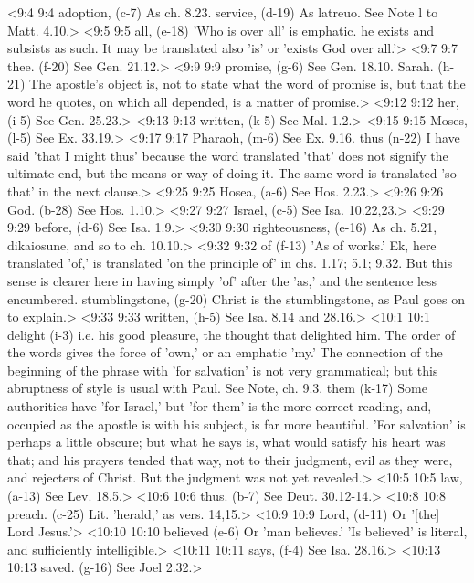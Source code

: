 <9:4 9:4  adoption, (c-7)  As ch. 8.23.
  service, (d-19)  As latreuo. See Note l to Matt. 4.10.>
<9:5 9:5  all, (e-18)  'Who is over all' is emphatic. he exists and subsists as  such. It may be translated also 'is' or 'exists God over all.'>
<9:7 9:7  thee. (f-20)  See Gen. 21.12.>
<9:9 9:9  promise, (g-6)  See Gen. 18.10.
  Sarah. (h-21)  The apostle's object is, not to state what the word of  promise is, but that the word he quotes, on which all depended,  is a matter of promise.>
<9:12 9:12  her, (i-5)  See Gen. 25.23.>
<9:13 9:13  written, (k-5)  See Mal. 1.2.>
<9:15 9:15  Moses, (l-5)  See Ex. 33.19.>
<9:17 9:17  Pharaoh, (m-6)  See Ex. 9.16.
  thus (n-22)  I have said 'that I might thus' because the word translated  'that' does not signify the ultimate end, but the means or way  of doing it. The same word is translated 'so that' in the next  clause.>
<9:25 9:25  Hosea, (a-6)  See Hos. 2.23.>
<9:26 9:26  God. (b-28)  See Hos. 1.10.>
<9:27 9:27  Israel, (c-5)  See Isa. 10.22,23.>
<9:29 9:29  before, (d-6)  See Isa. 1.9.>
<9:30 9:30  righteousness, (e-16)  As ch. 5.21, dikaiosune, and so to ch. 10.10.>
<9:32 9:32  of (f-13)  'As of works.' Ek, here translated 'of,' is translated 'on  the principle of' in chs. 1.17; 5.1; 9.32. But this sense is  clearer here in having simply 'of' after the 'as,' and the  sentence less encumbered.
  stumblingstone, (g-20)  Christ is the stumblingstone, as Paul goes on to explain.>
<9:33 9:33  written, (h-5)  See Isa. 8.14 and 28.16.>
<10:1 10:1  delight (i-3)  i.e. his good pleasure, the thought that delighted him. The  order of the words gives the force of 'own,' or an emphatic  'my.' The connection of the beginning of the phrase with  'for salvation' is not very grammatical; but this abruptness  of style is usual with Paul. See Note, ch. 9.3.
  them (k-17)  Some authorities have 'for Israel,' but 'for them' is the  more correct reading, and, occupied as the apostle is with his  subject, is far more beautiful. 'For salvation' is perhaps a  little obscure; but what he says is, what would satisfy his  heart was that; and his prayers tended that way, not to their  judgment, evil as they were, and rejecters of Christ. But the  judgment was not yet revealed.>
<10:5 10:5  law, (a-13)  See Lev. 18.5.>
<10:6 10:6  thus. (b-7)  See Deut. 30.12-14.>
<10:8 10:8  preach. (c-25)  Lit. 'herald,' as vers. 14,15.>
<10:9 10:9  Lord, (d-11)  Or '[the] Lord Jesus.'>
<10:10 10:10  believed (e-6)  Or 'man believes.' 'Is believed' is literal, and sufficiently  intelligible.>
<10:11 10:11  says, (f-4)  See Isa. 28.16.>
<10:13 10:13  saved. (g-16)  See Joel 2.32.>
